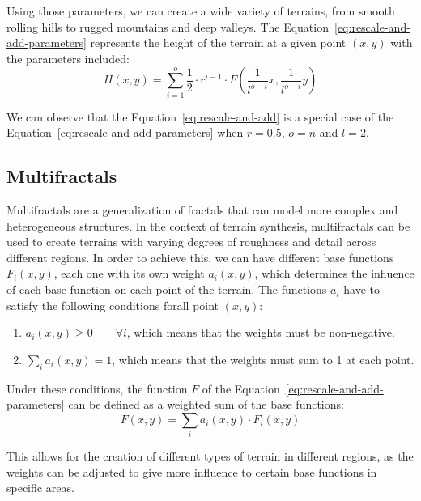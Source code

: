 Using those parameters, we can create a wide variety of terrains, from smooth rolling hills to rugged mountains and deep valleys. The Equation~\eqref{eq:rescale-and-add-parameters} represents the height of the terrain at a given point $(x, y)$ with the parameters included:
\begin{equation}
    H(x, y) = \sum_{i=1}^{o} \frac{1}{2}\cdot r^{i-1} \cdot F\left( \frac{1}{l^{o-i}} x, \frac{1}{l^{o-i}} y \right)
    \label{eq:rescale-and-add-parameters}
\end{equation}

We can observe that the Equation~\eqref{eq:rescale-and-add} is a special case of the Equation~\eqref{eq:rescale-and-add-parameters} when $r = 0.5$, $o = n$ and $l = 2$.

\subsection{Multifractals}

Multifractals are a generalization of fractals that can model more complex and heterogeneous structures. In the context of terrain synthesis, multifractals can be used to create terrains with varying degrees of roughness and detail across different regions. In order to achieve this, we can have different base functions $F_i(x,y)$, each one with its own weight $a_i(x,y)$, which determines the influence of each base function on each point of the terrain. The functions $a_i$ have to satisfy the following conditions forall point $(x,y)$:
\begin{enumerate}
    \item $a_i(x,y) \geq 0\qquad \forall i$, which means that the weights must be non-negative.
    \item $\sum\limits_{i} a_i(x,y) = 1$, which means that the weights must sum to 1 at each point.
\end{enumerate}

Under these conditions, the function $F$ of the Equation~\eqref{eq:rescale-and-add-parameters} can be defined as a weighted sum of the base functions:
\begin{equation}
    F(x,y) = \sum_{i} a_i(x,y) \cdot F_i(x,y)
\end{equation}

This allows for the creation of different types of terrain in different regions, as the weights can be adjusted to give more influence to certain base functions in specific areas.